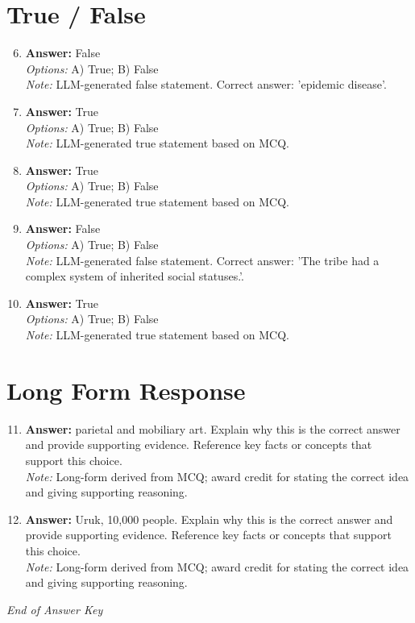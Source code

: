 \documentclass[12pt]{article}
\begin{document}
\section*{True / False}
\begin{enumerate}[label=\arabic*.]
\setcounter{enumi}{5}
\item \textbf{Answer:} False
\\ \textit{Options:} A) True; B) False
\\ \textit{Note:} LLM-generated false statement. Correct answer: 'epidemic disease'.
\item \textbf{Answer:} True
\\ \textit{Options:} A) True; B) False
\\ \textit{Note:} LLM-generated true statement based on MCQ.
\item \textbf{Answer:} True
\\ \textit{Options:} A) True; B) False
\\ \textit{Note:} LLM-generated true statement based on MCQ.
\item \textbf{Answer:} False
\\ \textit{Options:} A) True; B) False
\\ \textit{Note:} LLM-generated false statement. Correct answer: 'The tribe had a complex system of inherited social statuses.'.
\item \textbf{Answer:} True
\\ \textit{Options:} A) True; B) False
\\ \textit{Note:} LLM-generated true statement based on MCQ.
\end{enumerate}

\section*{Long Form Response}
\begin{enumerate}[label=\arabic*.]
\setcounter{enumi}{10}
\item \textbf{Answer:} parietal and mobiliary art. Explain why this is the correct answer and provide supporting evidence. Reference key facts or concepts that support this choice.
\\ \textit{Note:} Long-form derived from MCQ; award credit for stating the correct idea and giving supporting reasoning.
\item \textbf{Answer:} Uruk, 10,000 people. Explain why this is the correct answer and provide supporting evidence. Reference key facts or concepts that support this choice.
\\ \textit{Note:} Long-form derived from MCQ; award credit for stating the correct idea and giving supporting reasoning.
\end{enumerate}

\vfill
\noindent\textit{End of Answer Key}
\end{document}
